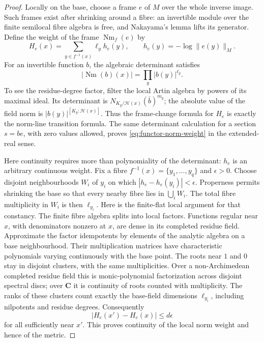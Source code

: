 \begin{proof}
Locally on the base, choose a frame $e$ of $M$ over the whole inverse
image. Such frames exist after shrinking around a fibre: an invertible
module over the finite semilocal fibre algebra is free, and Nakayama's
lemma lifts its generator. Define the weight of the frame $\operatorname{Nm}_f(e)$ by
\[
 H_e(x)=\sum_{y\in f^{-1}(x)}\ell_y h_e(y),
 \qquad h_e(y)=-\log\|e(y)\|_M.
\tag{67.12a}\label{eq:functor-norm-frame-weight}
\]
For an invertible function $b$, the algebraic determinant satisfies
\[
 |\operatorname{Nm}(b)(x)|
   =\prod_y |b(y)|^{\ell_y}.
\tag{67.12b}\label{eq:functor-norm-absolute-value}
\]
To see the residue-degree factor, filter the local Artin algebra by
powers of its maximal ideal. Its determinant is
$N_{K_y/\mathcal H(x)}(\bar b)^{m_y}$; the absolute value of the field
norm is $|b(y)|^{[K_y:\mathcal H(x)]}$.
Thus the frame-change formula for $H_e$ is exactly the norm-line
transition formula. The same determinant calculation for a section
$s=be$, with zero values allowed, proves
\eqref{eq:functor-norm-weight} in the extended-real sense.

Here continuity requires more than polynomiality of the determinant:
$h_e$ is an arbitrary continuous weight. Fix a fibre
$f^{-1}(x)=\{y_1,\ldots,y_q\}$ and $\epsilon>0$. Choose disjoint
neighbourhoods $W_i$ of $y_i$ on which
$|h_e-h_e(y_i)|<\epsilon$. Properness permits shrinking the base so
that every nearby fibre lies in $\bigcup_iW_i$. The total fibre
multiplicity in $W_i$ is then $\ell_{y_i}$. Here is the finite-flat
local argument for that constancy. The finite fibre algebra splits into
local factors. Functions regular near $x$, with denominators nonzero
at $x$, are dense in its completed residue field. Approximate the
factor idempotents by elements of the analytic
algebra on a base neighbourhood. Their multiplication matrices have
characteristic polynomials varying continuously with the base point.
The roots near $1$ and $0$ stay in disjoint clusters, with the same
multiplicities. Over a non-Archimedean completed residue field this is
monic-polynomial factorization across disjoint spectral discs; over
$\mathbf C$ it is continuity of roots counted with multiplicity.
The ranks of these clusters count exactly the base-field dimensions
$\ell_{y_i}$, including nilpotents and residue degrees. Consequently
\[
 |H_e(x')-H_e(x)|\leq d\epsilon
\tag{67.12c}\label{eq:functor-norm-continuity-bound}
\]
for all sufficiently near $x'$. This proves continuity of the local
norm weight and hence of the metric.
\end{proof}


